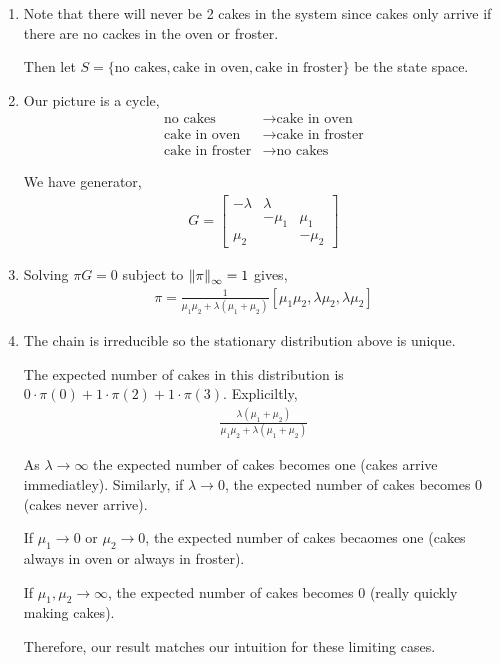 \begin{solution}[Solution]
\begin{enumerate}[label=(\alph*)]
    \item Note that there will never be 2 cakes in the system since cakes only arrive if there are no cackes in the oven or froster.

        Then let \( S = \{\text{no cakes}, \text{cake in oven}, \text{cake in froster}\} \) be the state space.

    \item

        Our picture is a cycle,
        \begin{align*}
            \text{no cakes} &\rightarrow \text{cake in oven}
            \\
            \text{cake in oven} &\rightarrow \text{cake in froster} 
            \\
            \text{cake in froster} &\rightarrow \text{no cakes}
        \end{align*} 

        We have generator,
        \begin{align*}
            G = \left[\begin{array}{rrr}-\lambda & \lambda \\ & - \mu_1 & \mu_1 \\ \mu_2 & & -\mu_2\end{array}\right]
        \end{align*}

    \item
        Solving \( \pi G = 0 \) subject to \( \left\lVert\pi\right\rVert_\infty = 1 \) gives,
        \begin{align*}
            \pi = \frac{1}{ \mu_1\mu_2 + \lambda(\mu_1+\mu_2)} [\mu_1\mu_2, \lambda \mu_2, \lambda \mu_2]
        \end{align*}
        
    \item The chain is irreducible so the stationary distribution above is unique. 

        The expected number of cakes in this distribution is \( 0 \cdot \pi(0) + 1 \cdot \pi(2) + 1 \cdot \pi(3) \). Expliciltly,
        \begin{align*}
            \frac{\lambda (\mu_1+\mu_2)}{\mu_1\mu_2 + \lambda(\mu_1+\mu_2)}
        \end{align*}

        As \( \lambda\to \infty \) the expected number of cakes becomes one (cakes arrive immediatley). Similarly, if \( \lambda \to 0 \), the expected number of cakes becomes 0 (cakes never arrive). 

        If \( \mu_1\to 0 \) or \( \mu_2\to 0 \), the expected number of cakes becaomes one (cakes always in oven or always in froster). 
        
        If \( \mu_1,\mu_2\to\infty \), the expected number of cakes becomes 0 (really quickly making cakes).

        Therefore, our result matches our intuition for these limiting cases.

\end{enumerate}
\end{solution}


